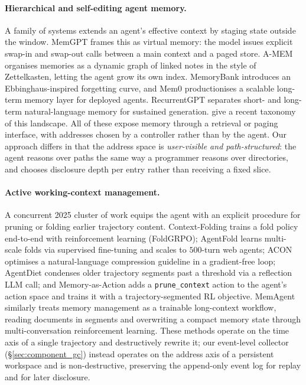 
\paragraph{Hierarchical and self-editing agent memory.}
A family of systems extends an agent's effective context by staging
state outside the window. MemGPT \citep{packer2023memgpt} frames this
as virtual memory: the model issues explicit swap-in and swap-out
calls between a main context and a paged store. A-MEM
\citep{xu2025amem} organises memories as a dynamic graph of linked
notes in the style of Zettelkasten, letting the agent grow its own
index. MemoryBank \citep{zhong2024memorybank} introduces an
Ebbinghaus-inspired forgetting curve, and Mem0
\citep{chhikara2025mem0} productionises a scalable long-term memory
layer for deployed agents. RecurrentGPT \citep{zhou2023recurrentgpt}
separates short- and long-term natural-language memory for sustained
generation. \citet{zhang2025memorysurvey} give a recent taxonomy of
this landscape. All of these expose memory through a retrieval or
paging interface, with addresses chosen by a controller rather than
by the agent. Our approach differs in that the address space is
\emph{user-visible and path-structured}: the agent reasons over paths
the same way a programmer reasons over directories, and chooses
disclosure depth per entry rather than receiving a fixed slice.

\paragraph{Active working-context management.}
A concurrent 2025 cluster of work equips the agent with an explicit
procedure for pruning or folding earlier trajectory content.
Context-Folding \citep{sun2025contextfolding} trains a fold policy
end-to-end with reinforcement learning (FoldGRPO); AgentFold
\citep{ye2025agentfold} learns multi-scale folds via supervised
fine-tuning and scales to $500$-turn web agents; ACON
\citep{kang2025acon} optimises a natural-language compression
guideline in a gradient-free loop; AgentDiet \citep{xu2025agentdiet}
condenses older trajectory segments past a threshold via a reflection
LLM call; and Memory-as-Action \citep{zhang2025memact} adds a
\texttt{prune\_context} action to the agent's action space and trains
it with a trajectory-segmented RL objective. MemAgent
\citep{yu2025memagent} similarly treats memory management as a
trainable long-context workflow, reading documents in segments and
overwriting a compact memory state through multi-conversation
reinforcement learning. These methods operate on
the time axis of a single trajectory and destructively rewrite it;
our event-level collector (\S\ref{sec:component_gc}) instead operates
on the address axis of a persistent workspace and is non-destructive,
preserving the append-only event log for replay and for later
disclosure.

